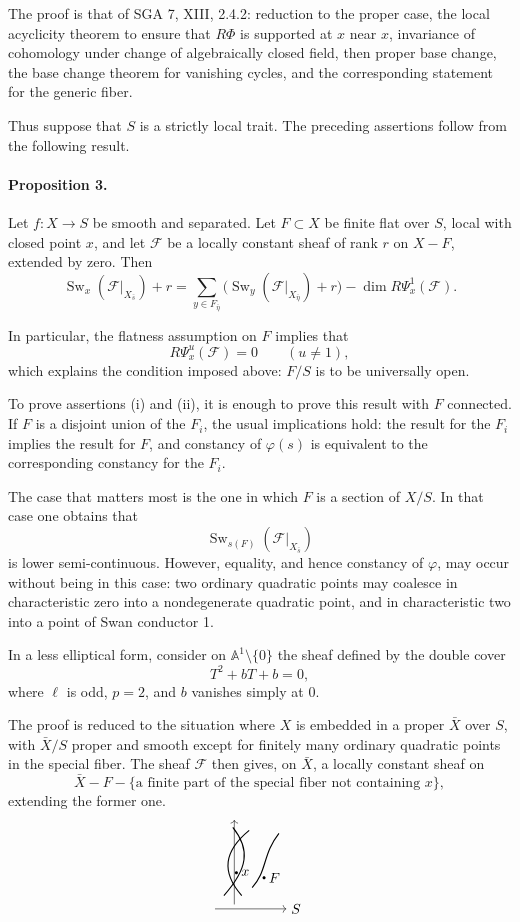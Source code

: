 \documentclass[11pt]{article}
\newcommand{\semistableSketch}{%
\begin{tikzpicture}[scale=.75,baseline=-.5ex]
  \draw[->] (-.2,0) -- (2.2,0) node[right]{$S$};
  \draw[->] (.45,.15) -- (.45,3.0);
  \draw[thick] (.1,.45) .. controls (.9,1.35) and (1.0,2.0) .. (.4,2.75);
  \draw[thick] (.7,.45) .. controls (.0,1.25) and (.1,1.95) .. (.95,2.65);
  \draw[thick] (1.05,.72) .. controls (1.55,1.25) and (1.4,1.85) .. (1.95,2.55);
  \fill (.52,1.22) circle (1.5pt) node[right]{$x$};
  \fill (1.45,1.05) circle (1.5pt) node[right]{$F$};
\end{tikzpicture}%
}
\newcommand{\F}{\mathcal F}
\DeclareMathOperator{\Sw}{Sw}
\begin{document}
The proof is that of SGA 7, XIII, 2.4.2: reduction to the proper case, the local acyclicity theorem to ensure that \(R\Phi\) is supported at \(x\) near \(x\), invariance of cohomology under change of algebraically closed field, then proper base change, the base change theorem for vanishing cycles, and the corresponding statement for the generic fiber.

Thus suppose that \(S\) is a strictly local trait. The preceding assertions follow from the following result.

\paragraph{Proposition 3.}
Let \(f:X\to S\) be smooth and separated. Let \(F\subset X\) be finite flat over \(S\), local with closed point \(x\), and let \(\F\) be a locally constant sheaf of rank \(r\) on \(X-F\), extended by zero. Then
\[
\Sw_x(\F|_{X_{\bar s}})+r
=
\sum_{y\in F_{\bar\eta}}
\bigl(\Sw_y(\F|_{X_{\bar\eta}})+r\bigr)
-
\dim R\Psi_x^1(\F).
\]

In particular, the flatness assumption on \(F\) implies that
\[
  R\Psi_x^u(\F)=0\qquad (u\ne 1),
\]
which explains the condition imposed above: \(F/S\) is to be universally open.

To prove assertions (i) and (ii), it is enough to prove this result with \(F\) connected. If \(F\) is a disjoint union of the \(F_i\), the usual implications hold: the result for the \(F_i\) implies the result for \(F\), and constancy of \(\varphi(s)\) is equivalent to the corresponding constancy for the \(F_i\).

The case that matters most is the one in which \(F\) is a section of \(X/S\). In that case one obtains that
\[
  \Sw_{s(F)}(\F|_{X_{\bar s}})
\]
is lower semi-continuous. However, equality, and hence constancy of \(\varphi\), may occur without being in this case: two ordinary quadratic points may coalesce in characteristic zero into a nondegenerate quadratic point, and in characteristic two into a point of Swan conductor 1.

In a less elliptical form, consider on \(\mathbb A^1\setminus\{0\}\) the sheaf defined by the double cover
\[
  T^2+bT+b=0,
\]
where \(\ell\) is odd, \(p=2\), and \(b\) vanishes simply at \(0\).

The proof is reduced to the situation where \(X\) is embedded in a proper \(\bar X\) over \(S\), with \(\bar X/S\) proper and smooth except for finitely many ordinary quadratic points in the special fiber. The sheaf \(\F\) then gives, on \(\bar X\), a locally constant sheaf on
\[
  \bar X-F-\{
  \text{a finite part of the special fiber not containing }x
  \},
\]
extending the former one.
\[
\semistableSketch
\]
\end{document}
